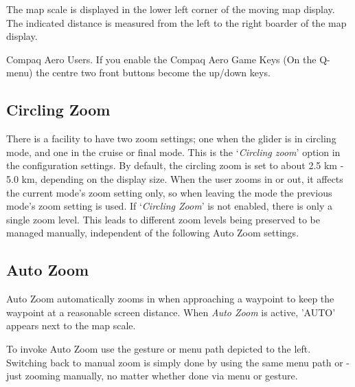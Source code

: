The map scale is displayed in the lower left corner of the moving map
display. The indicated distance is measured from the left to the right boarder
of the map display.

Compaq Aero Users. If you enable the Compaq Aero Game Keys (On the
Q-menu) the centre two front buttons become the up/down keys.

\subsection*{Circling Zoom}
There is a facility to have two zoom settings; one when the glider is
in circling mode, and one in the cruise or final mode.  This is the `{\it Circling zoom}' 
option in the  configuration settings.  
By default, the circling zoom is set to about 2.5 km - 5.0 km, depending on the
display size. When the user zooms in or out, it affects the current
mode's zoom setting only, so when leaving the mode the previous mode's
zoom setting is used.  If `{\it Circling Zoom}' is not enabled,
there is only a single zoom level.
This leads to different zoom levels being preserved to be managed manually, 
independent of the following Auto Zoom settings.

\subsection*{Auto Zoom}
Auto Zoom automatically zooms in when approaching a waypoint to keep
the waypoint at a reasonable screen distance. When \emph{Auto Zoom} is active,
'AUTO' appears next to the map scale.

To invoke Auto Zoom use the gesture 
or menu path depicted to the left. 
Switching back to manual zoom is simply done by using the same menu path
or - just zooming manually, no matter whether done via menu or gesture. 

